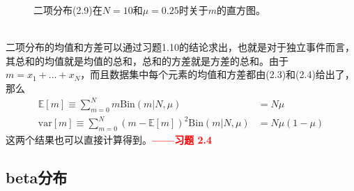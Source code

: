 \documentclass[b5paper]{book}
\numberwithin{equation}{chapter}
\begin{document}
{\begin{figure}[ht]
		\caption{二项分布(2.9)在$N=10$和$\mu=0.25$时关于$m$的直方图。}
		\label{fig:2-1}
	\end{figure}
	\\
	\indent 二项分布的均值和方差可以通过习题1.10的结论求出，也就是对于独立事件而言，其总和的均值就是均值的总和，总和的方差就是方差的总和。由于$m=x_1+...+x_N$，而且数据集中每个元素的均值和方差都由(2.3)和(2.4)给出了，那么
	\begin{align}
		\mathbb{E}[m] \equiv \sum_{m=0}^{N}m \mathrm{Bin}(m|N,\mu) &= N\mu \\
		\mathrm{var}[m] \equiv \sum_{m=0}^N(m-\mathbb{E}[m])^2\mathrm{Bin}(m|N,\mu) &= N\mu(1-\mu)
	\end{align}
	这两个结果也可以直接计算得到。\textcolor{red}{\textbf{——习题 2.4}}
	}
	\subsection{beta分布}
\end{document}
